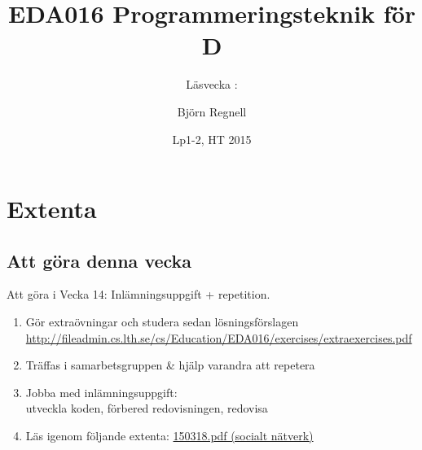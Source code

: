\documentclass{lecturenotes}
\title[Föreläsningsanteckningar EDA016, 2015]{EDA016 Programmeringsteknik för D}
\subtitle{Läsvecka \vecka: \tema}
\author{Björn Regnell}
\institute{Datavetenskap, LTH}
\date{Lp1-2, HT 2015}
\renewcommand{\vecka}{14}
\newcommand{\tema}{Extenta}
\begin{document}
\frame{\titlepage}
\setnextsection{\vecka}
\section[Vecka \vecka: \tema]{\tema}
\frame{\tableofcontents}

\subsection{Att göra denna vecka}
\begin{Slide}{Att göra i Vecka \vecka: Inlämningsuppgift + repetition.}
\begin{enumerate}
\item Gör extraövningar och studera sedan lösningsförslagen \\ {\scriptsize \url{http://fileadmin.cs.lth.se/cs/Education/EDA016/exercises/extraexercises.pdf}}
\item Träffas i samarbetsgruppen \& hjälp varandra att repetera
\item Jobba med inlämningsuppgift: \\ utveckla koden, förbered redovisningen, redovisa
\item Läs igenom följande extenta: \href{http://fileadmin.cs.lth.se/cs//Education/grundkurs/extentor/150318.pdf}{150318.pdf (socialt nätverk)}
\end{enumerate}
\end{Slide}
\end{document}
